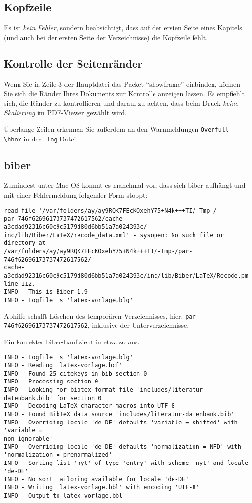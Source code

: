 \subsection{Kopfzeile}
Es ist \emph{kein Fehler}, sondern beabsichtigt, dass auf der ersten Seite eines Kapitels (und auch bei der ersten Seite der Verzeichnisse) die Kopfzeile fehlt.

\subsection{Kontrolle der Seitenränder}
Wenn Sie in Zeile 3 der Hauptdatei das Packet \enquote{showframe} einbinden, können Sie sich die Ränder Ihres Dokuments zur Kontrolle anzeigen lassen. Es empfiehlt sich, die Ränder zu kontrollieren und darauf zu achten, dass beim Druck \emph{keine Skalierung} im PDF-Viewer gewählt wird.  

Überlange Zeilen erkennen Sie außerdem an den Warnmeldungen \verb|Overfull \hbox| in der \verb|.log|-Datei.

\subsection{biber}
Zumindest unter Mac OS kommt es manchmal vor, dass sich biber aufhängt und mit einer Fehlermeldung folgender Form stoppt:

{\small
\begin{verbatim}
read_file '/var/folders/ay/ay9RQK7FEcKOxehY75+N4k+++TI/-Tmp-/
par-746f62696173737472617562/cache-a3cdad92316c60c9c5179d80d6bb51a7a024393c/
inc/lib/Biber/LaTeX/recode_data.xml' - sysopen: No such file or directory at 
/var/folders/ay/ay9RQK7FEcKOxehY75+N4k+++TI/-Tmp-/par-746f62696173737472617562/
cache-a3cdad92316c60c9c5179d80d6bb51a7a024393c/inc/lib/Biber/LaTeX/Recode.pm 
line 112.
INFO - This is Biber 1.9
INFO - Logfile is 'latex-vorlage.blg'
\end{verbatim}
}

Abhilfe schafft Löschen des temporären Verzeichnisses, hier: \verb|par-746f62696173737472617562|, inklusive der Unterverzeichnisse.

Ein korrekter biber-Lauf sieht in etwa so aus:
{\small
\begin{verbatim}
INFO - Logfile is 'latex-vorlage.blg'
INFO - Reading 'latex-vorlage.bcf'
INFO - Found 25 citekeys in bib section 0
INFO - Processing section 0
INFO - Looking for bibtex format file 'includes/literatur-datenbank.bib' for section 0
INFO - Decoding LaTeX character macros into UTF-8
INFO - Found BibTeX data source 'includes/literatur-datenbank.bib'
INFO - Overriding locale 'de-DE' defaults 'variable = shifted' with 'variable = 
non-ignorable'
INFO - Overriding locale 'de-DE' defaults 'normalization = NFD' with 
'normalization = prenormalized'
INFO - Sorting list 'nyt' of type 'entry' with scheme 'nyt' and locale 'de-DE'
INFO - No sort tailoring available for locale 'de-DE'
INFO - Writing 'latex-vorlage.bbl' with encoding 'UTF-8'
INFO - Output to latex-vorlage.bbl 
\end{verbatim}
}

